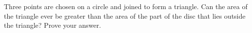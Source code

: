 Three points are chosen on a circle and joined to form a triangle. Can the area of the triangle ever be greater than the area of the part of the disc that lies outside the triangle? Prove your answer.
